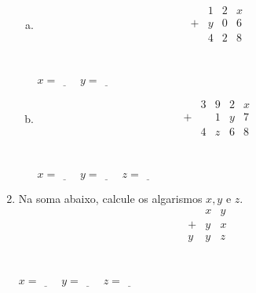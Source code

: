 \documentclass[a4paper,14pt]{article}
\begin{document}
\begin{multicols}{2}
\begin{enumerate}
\begin{enumerate}[a)]
				\item \[
				\begin{array}{cccc}
					~ & 1 & 2 & x \\
					+ & y & 0 & 6 \\
					\hline
					~ & 4 & 2 & 8 \\
				\end{array}
				\] \\\\
				$x = \underline{~~~~~} ~~~~y = \underline{~~~~~}$
				\item \[
				\begin{array}{ccccc}
					~ & 3 & 9 & 2 & x \\
					+ & ~ & 1 & y & 7 \\
					\hline
					~ & 4 & z & 6 & 8\\
				\end{array}
				\] \\\\
				$x = \underline{~~~~~} ~~~~y = \underline{~~~~~} ~~~~z = \underline{~~~~~} $
			\end{enumerate}	
			\item Na soma abaixo, calcule os algarismos $x, y$ e $z$.
			 \[
			\begin{array}{ccc}
				~ & x & y \\
				+ & y & x \\
				\hline
				y & y & z \\
			\end{array}
			\] \\\\
			$x = \underline{~~~~~} ~~~~y = \underline{~~~~~} ~~~~z = \underline{~~~~~} $
		\end{enumerate}
		$~$ \\ $~$ \\ $~$ \\ $~$ \\ $~$ \\ $~$ \\ $~$ \\ $~$ \\ $~$ \\ $~$ \\ $~$ \\ $~$ \\ $~$ \\ $~$ \\ $~$ \\ $~$ \\ $~$ \\ $~$ \\ $~$ \\ $~$ \\ $~$ \\ $~$
	\end{multicols}
\end{document}
